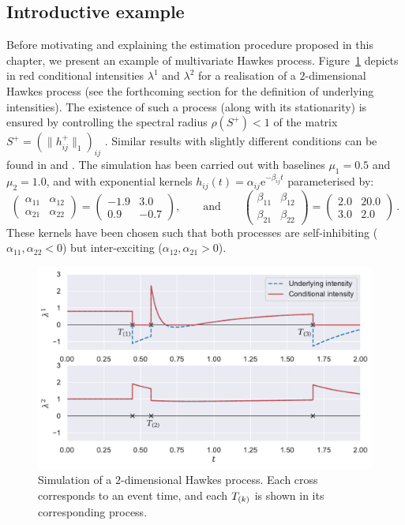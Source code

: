     \subsection{Introductive example}
    Before motivating and explaining the estimation procedure proposed in this chapter, we present an example of multivariate Hawkes process.
    Figure~\ref{fig:chap3_2_dimension_example} depicts in red conditional intensities \(\lambda^1\) and \(\lambda^2\) for a realisation of a \(2\)-dimensional Hawkes process (see the forthcoming section for the definition of underlying intensities). The existence of such a process (along with its stationarity) is ensured by controlling the spectral radius $\rho(S^+) < 1$ of the matrix $S^+ = (\|h_{ij}^+\|_1)_{ij}$ \parencite{Deutsch2022}. Similar results with slightly different conditions can be found in \textcite{Bremaud1996} and \textcite{Sulem2021}.
    The simulation has been carried out with baselines \(\mu_1 = 0.5\) and \(\mu_2 = 1.0\),
    and with exponential kernels \(h_{ij}(t) = \alpha_{ij} \mathrm{e}^{-\beta_{ij}t}\) parameterised by:
    \[
      \begin{pmatrix}
      \alpha_{11} & \alpha_{12}\\
      \alpha_{21} & \alpha_{22}
      \end{pmatrix}=
      \begin{pmatrix}
      -1.9 & 3.0\\
      0.9 & -0.7
      \end{pmatrix},
      \qquad
      \text{and}
      \qquad
      \begin{pmatrix}
      \beta_{11} & \beta_{12}\\
      \beta_{21} & \beta_{22}
      \end{pmatrix} =
      \begin{pmatrix}
      2.0 & 20.0\\
      3.0 & 2.0
      \end{pmatrix}\,.
    \]
    These kernels have been chosen such that both processes are self-inhibiting ($\alpha_{11}, \alpha_{22} < 0$) but inter-exciting ($\alpha_{12}, \alpha_{21} > 0$).

    \begin{figure}[!ht]
    \centering
    \includegraphics[width=.75\linewidth]{images/chapter3/timesMarkedMulti.pdf}
    \caption{Simulation of a \(2\)-dimensional Hawkes process. Each cross corresponds to an event time, and each $T_{(k)}$ is shown in its corresponding process.}
    \label{fig:chap3_2_dimension_example}
    \end{figure}

